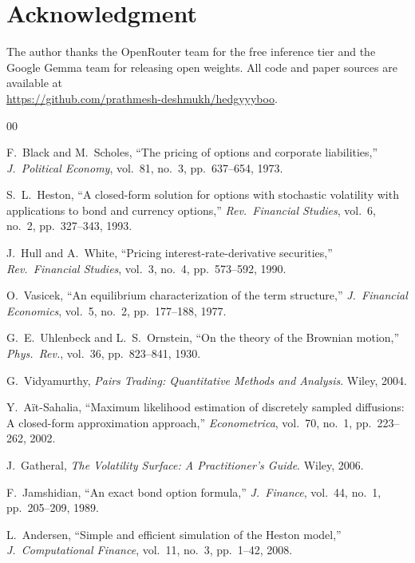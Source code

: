 \documentclass[conference]{IEEEtran}
\begin{document}
\section*{Acknowledgment}
The author thanks the OpenRouter team for the free inference tier and the Google Gemma team for releasing open weights. All code and paper sources are available at\\
\url{https://github.com/prathmesh-deshmukh/hedgyyyboo}.

\begin{thebibliography}{00}

F.~Black and M.~Scholes, ``The pricing of options and corporate liabilities,''
\emph{J.~Political Economy}, vol.~81, no.~3, pp.~637--654, 1973.

S.~L.~Heston, ``A closed-form solution for options with stochastic volatility with applications to bond and currency options,''
\emph{Rev.~Financial Studies}, vol.~6, no.~2, pp.~327--343, 1993.

J.~Hull and A.~White, ``Pricing interest-rate-derivative securities,''
\emph{Rev.~Financial Studies}, vol.~3, no.~4, pp.~573--592, 1990.

O.~Vasicek, ``An equilibrium characterization of the term structure,''
\emph{J.~Financial Economics}, vol.~5, no.~2, pp.~177--188, 1977.

G.~E.~Uhlenbeck and L.~S.~Ornstein, ``On the theory of the Brownian motion,''
\emph{Phys.~Rev.}, vol.~36, pp.~823--841, 1930.

G.~Vidyamurthy, \emph{Pairs Trading: Quantitative Methods and Analysis}. Wiley, 2004.

Y.~A\"it-Sahalia, ``Maximum likelihood estimation of discretely sampled diffusions: A closed-form approximation approach,''
\emph{Econometrica}, vol.~70, no.~1, pp.~223--262, 2002.

J.~Gatheral, \emph{The Volatility Surface: A Practitioner's Guide}. Wiley, 2006.

F.~Jamshidian, ``An exact bond option formula,''
\emph{J.~Finance}, vol.~44, no.~1, pp.~205--209, 1989.

L.~Andersen, ``Simple and efficient simulation of the Heston model,''
\emph{J.~Computational Finance}, vol.~11, no.~3, pp.~1--42, 2008.


\end{thebibliography}
\end{document}
